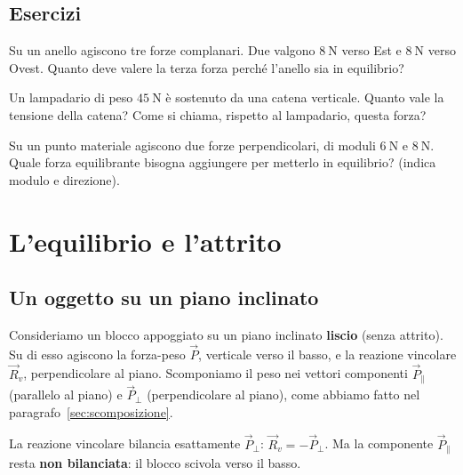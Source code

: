 \subsection{Esercizi}

\begin{esercizio}
Su un anello agiscono tre forze complanari. Due valgono $\SI{8}{\newton}$ verso Est e $\SI{8}{\newton}$ verso Ovest. Quanto deve valere la terza forza perché l'anello sia in equilibrio?\\
\end{esercizio}

\begin{esercizio}
Un lampadario di peso $\SI{45}{\newton}$ è sostenuto da una catena verticale. Quanto vale la tensione della catena? Come si chiama, rispetto al lampadario, questa forza?\\
\end{esercizio}

\begin{esercizio}
Su un punto materiale agiscono due forze perpendicolari, di moduli $\SI{6}{\newton}$ e $\SI{8}{\newton}$. Quale forza equilibrante bisogna aggiungere per metterlo in equilibrio? (indica modulo e direzione).\\
\end{esercizio}


\section{L'equilibrio e l'attrito}

\subsection{Un oggetto su un piano inclinato}
Consideriamo un blocco appoggiato su un piano inclinato \textbf{liscio} (senza attrito). Su di esso agiscono la forza-peso $\vec{P}$, verticale verso il basso, e la reazione vincolare $\vec{R}_v$, perpendicolare al piano. Scomponiamo il peso nei vettori componenti $\vec{P}_\parallel$ (parallelo al piano) e $\vec{P}_\perp$ (perpendicolare al piano), come abbiamo fatto nel paragrafo~\ref{sec:scomposizione}.

La reazione vincolare bilancia esattamente $\vec{P}_\perp$: $\vec{R}_v = -\vec{P}_\perp$. Ma la componente $\vec{P}_\parallel$ resta \textbf{non bilanciata}: il blocco scivola verso il basso.

